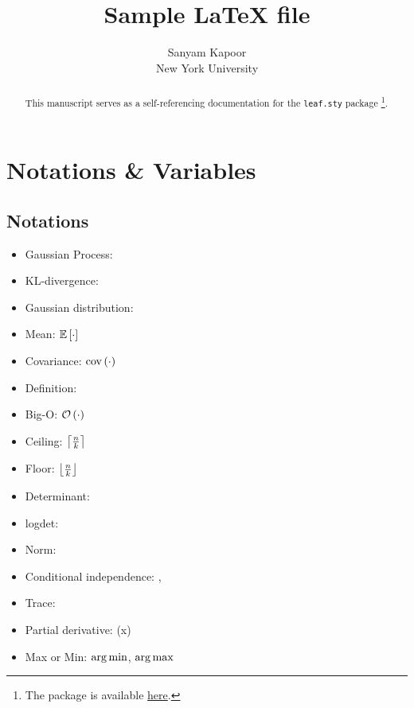 \documentclass{article}
\begin{document}
\title{Sample \LaTeX{ }file}

\author{\name Sanyam Kapoor \\
        \addr New York University}


\maketitle

\begin{abstract}%
This manuscript serves as a self-referencing documentation for the \texttt{leaf.sty} package \footnote{The package is available \href{https://github.com/activatedgeek/latexfiles}{here}.}.
\end{abstract}


\section{Notations \& Variables}

\subsection{Notations}

\begin{itemize}
\item Gaussian Process: \gp{\cdot,\cdot}
\item KL-divergence: \kl
\item Gaussian distribution: \gaussian{\cdot, \cdot}
\item Mean: $\mathbb{E}\left[\cdot\right]$
\item Covariance: $\mathrm{cov}\left(\cdot\right)$
\item Definition: 
\item Big-O:  $\mathcal{O}\left(\cdot\right)$
\item Ceiling: $\left\lceil \tfrac{n}{k} \right\rceil$
\item Floor: $\left\lfloor \tfrac{n}{k} \right\rfloor$
\item Determinant: \determ{\cdot}
\item logdet: \logdet{\cdot}
\item Norm: \norm{\cdot}
\item Conditional independence: \ci, \nci
\item Trace: \tr{\cdot}
\item Partial derivative: (x)
\item Max or Min: $\operatorname*{\arg\min}$, $\operatorname*{\arg\max}$
\end{itemize}
\end{document}
